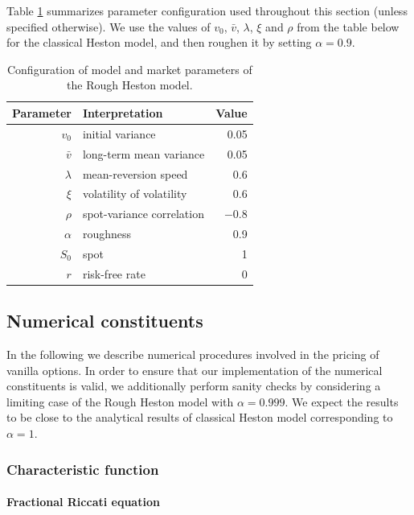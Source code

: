 \documentclass[12pt,twoside]{article}
\theoremstyle{plain}
\theoremstyle{plain}
\theoremstyle{definition}
\theoremstyle{remark}
\numberwithin{equation}{section}
\begin{document}
Table \ref{table: rough heston parameters} summarizes parameter configuration used throughout this section (unless specified otherwise). We use the values of $v_0$, $\bar v$, $\lambda$, $\xi$ and $\rho$ from the table below for the classical Heston model, and then roughen it by setting $\alpha=0.9$.

\vspace{20pt}

\begin{table}[H]
\centering
\begin{tabular}{r l r} 
    \hline
    Parameter & Interpretation & Value \\
    \hline\hline
    $v_0$ & initial variance & 0.05 \\
    $\bar v$ & long-term mean variance & 0.05 \\
    $\lambda$ & mean-reversion speed & 0.6 \\
    $\xi$ & volatility of volatility & 0.6 \\
    $\rho$ & spot-variance correlation & $-0.8$ \\
    $\alpha$ & roughness &  0.9 \\
    \hline
    $S_0$ & spot & 1 \\
    $r$ & risk-free rate & 0 \\
    \hline
\end{tabular}
\caption{Configuration of model and market parameters of the Rough Heston model.}
\label{table: rough heston parameters}
\end{table}

\subsection{Numerical constituents}
\label{sec: numerical scheme of characteristic function}

In the following we describe numerical procedures involved in the pricing of vanilla options. In order to ensure that our implementation of the numerical constituents is valid, we additionally perform sanity checks by considering a limiting case of the Rough Heston model with $\alpha=0.999$. We expect the results to be close to the analytical results of classical Heston model corresponding to $\alpha=1$.

\subsubsection{Characteristic function}

\paragraph{Fractional Riccati equation}
\end{document}
